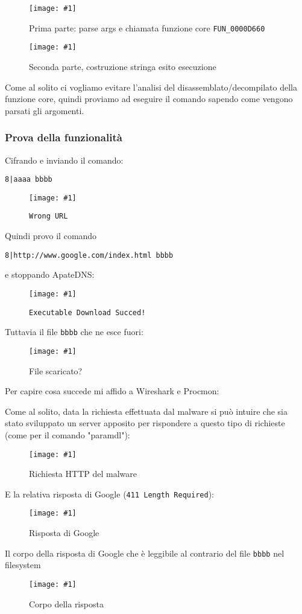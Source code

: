 \documentclass[
    a4paper, %
    11pt %
]{article}
\newcommand{\pic}[4]{\begin{figure}[H]
            \centering
            \texttt{[image: \#1]}
            \caption{#2}
            \label{fig:#1}
            \end{figure}}
\begin{document}
            \pic{adv_8_firstpass}{Prima parte: parse args e chiamata funzione core \texttt{FUN\_0000D660}}{15cm}{8cm}
            \pic{adv_8_secondpass}{Seconda parte, costruzione stringa esito esecuzione}{10cm}{10cm}
            
            Come al solito ci vogliamo evitare l'analisi del disassemblato/decompilato della funzione core,
            quindi proviamo ad eseguire il comando sapendo come vengono parsati gli argomenti.

            \subsubsection{Prova della funzionalità}

            Cifrando e inviando il comando:
            \begin{center}
                \texttt{8|aaaa bbbb}
            \end{center}

            \pic{adv_8_exec_fail}{\texttt{Wrong URL}}{19cm}{2cm}

            Quindi provo il comando
            \begin{center}
                \texttt{8|http://www.google.com/index.html bbbb}
            \end{center}
            
            e stoppando ApateDNS:

            \pic{adv_8_exec_ok}{\texttt{Executable Download Succed!}}{19cm}{1.5cm}

            Tuttavia il file \texttt{bbbb} che ne esce fuori:

            \pic{adv_8_unkfile}{File scaricato?}{19cm}{14cm}

            Per capire cosa succede mi affido a Wireshark e Procmon:

            Come al solito, data la richiesta effettuata dal malware si può intuire che sia stato sviluppato
            un server apposito per rispondere a questo tipo di richieste (come per il comando "paramdl"):
            \pic{adv_8_req}{Richiesta HTTP del malware}{10cm}{5cm}

            E la relativa risposta di Google (\texttt{411 Length Required}):
            \pic{adv_8_res}{Risposta di Google}{10cm}{5cm}

            Il corpo della risposta di Google che è leggibile al contrario del file \texttt{bbbb} nel filesystem
            \pic{adv_8_text}{Corpo della risposta}{11cm}{6cm}
\end{document}
